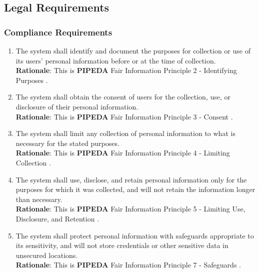 \documentclass[]{article}
\begin{document}
\subsection{Legal Requirements}
\label{sub:legal_requirements}

\subsubsection{Compliance Requirements}
\label{ssub:compliance_requirements}
\begin{enumerate}[{LR-COMP}1. ]
    \item The system shall identify and document the purposes for collection or use of its users' personal information before or at the time of collection. \\
    \textbf{Rationale}: This is \textbf{PIPEDA} Fair Information Principle 2 - Identifying Purposes \cite{pipedaAll}.

    \item The system shall obtain the consent of users for the collection, use, or disclosure of their personal information. \\
    \textbf{Rationale}: This is \textbf{PIPEDA} Fair Information Principle 3 - Consent \cite{pipedaAll}.

    \item The system shall limit any collection of personal information to what is necessary for the stated purposes. \\
    \textbf{Rationale}: This is \textbf{PIPEDA} Fair Information Principle 4 - Limiting Collection \cite{pipedaAll}.

    \item The system shall use, disclose, and retain personal information only for the purposes for which it was collected, and will not retain the information longer than necessary. \\
    \textbf{Rationale}: This is \textbf{PIPEDA} Fair Information Principle 5 - Limiting Use, Disclosure, and Retention \cite{pipedaAll}.

    \item The system shall protect personal information with safeguards appropriate to its sensitivity, and will not store credentials or other sensitive data in unsecured locations. \\
    \textbf{Rationale}: This is \textbf{PIPEDA} Fair Information Principle 7 - Safeguards \cite{pipedaAll}.
\end{enumerate}
\end{document}
